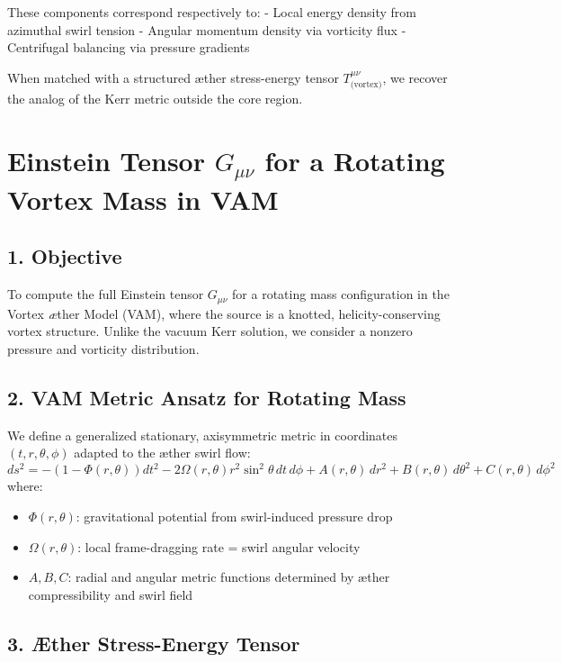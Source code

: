 \documentclass[twocolumn,aps,pre,floatfix,nofootinbib]{revtex4-2}
\begin{document}
    These components correspond respectively to:
    - Local energy density from azimuthal swirl tension
    - Angular momentum density via vorticity flux
    - Centrifugal balancing via pressure gradients

    When matched with a structured æther stress-energy tensor \( T^{\mu\nu}_{\text{(vortex)}} \), we recover the analog of the Kerr metric outside the core region.

    \section*{Einstein Tensor \(G_{\mu\nu}\) for a Rotating Vortex Mass in VAM}

    \subsection*{1. Objective}

    To compute the full Einstein tensor \(G_{\mu\nu}\) for a rotating mass configuration in the Vortex \textit{\ae}ther Model (VAM), where the source is a knotted, helicity-conserving vortex structure. Unlike the vacuum Kerr solution, we consider a nonzero pressure and vorticity distribution.

    \subsection*{2. VAM Metric Ansatz for Rotating Mass}

    We define a generalized stationary, axisymmetric metric in coordinates \((t, r, \theta, \phi)\) adapted to the æther swirl flow:
    \begin{equation}
        ds^2 = -\left(1 - \Phi(r,\theta)\right) dt^2 - 2 \Omega(r,\theta) r^2 \sin^2\theta\, dt\, d\phi + A(r,\theta)\, dr^2 + B(r,\theta)\, d\theta^2 + C(r,\theta)\, d\phi^2
    \end{equation}
    where:
    \begin{itemize}
        \item \( \Phi(r,\theta) \): gravitational potential from swirl-induced pressure drop
        \item \( \Omega(r,\theta) \): local frame-dragging rate = swirl angular velocity
        \item \( A, B, C \): radial and angular metric functions determined by æther compressibility and swirl field
    \end{itemize}

    \subsection*{3. Æther Stress-Energy Tensor}
\end{document}
